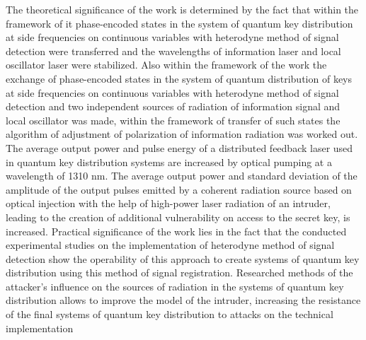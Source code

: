 The theoretical significance of the work is determined by the fact that within the framework of it phase-encoded states in the system of quantum key distribution at side frequencies on continuous variables with heterodyne method of signal detection were transferred and the wavelengths of information laser and local oscillator laser were stabilized. Also within the framework of the work the exchange of phase-encoded states in the system of quantum distribution of keys at side frequencies on continuous variables with heterodyne method of signal detection and two independent sources of radiation of information signal and local oscillator was made, within the framework of transfer of such states the algorithm of adjustment of polarization of information radiation was worked out. The average output power and pulse energy of a distributed feedback laser used in quantum key distribution systems are increased by optical pumping at a wavelength of 1310 nm. The average output power and standard deviation of the amplitude of the output pulses emitted by a coherent radiation source based on optical injection with the help of high-power laser radiation of an intruder, leading to the creation of additional vulnerability on access to the secret key, is increased. 
Practical significance of the work lies in the fact that the conducted experimental studies on the implementation of heterodyne method of signal detection show the operability of this approach to create systems of quantum key distribution using this method of signal registration. Researched methods of the attacker's influence on the sources of radiation in the systems of quantum key distribution allows to improve the model of the intruder, increasing the resistance of the final systems of quantum key distribution to attacks on the technical implementation


